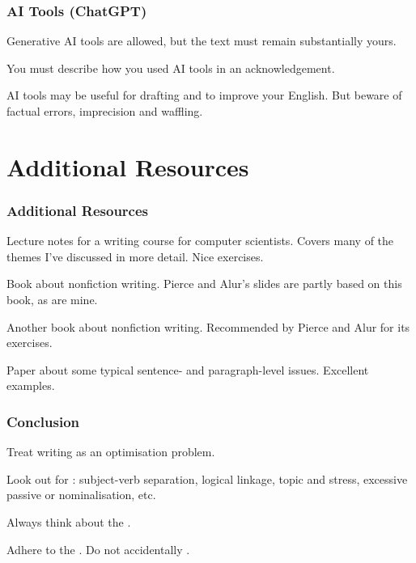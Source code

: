 \begin{frame}
  \frametitle{AI Tools (ChatGPT)}

  Generative AI tools are allowed, but the text must remain substantially yours.

  \medskip
  \pause

  You must describe how you used AI tools in an acknowledgement.

  \medskip
  \pause

  AI tools may be useful for drafting and to improve your English.
  But beware of factual errors, imprecision and waffling.
\end{frame}

\section{Additional Resources}

\begin{frame}
  \frametitle{Additional Resources}

  \small


  Lecture notes for a writing course for computer scientists.
  Covers many of the themes I've discussed in more detail.
  Nice exercises.

  \medskip


  Book about nonfiction writing.
  Pierce and Alur's slides are partly based on this book, as are mine.

  \medskip


  Another book about nonfiction writing.
  Recommended by Pierce and Alur for its exercises.

  \medskip


  Paper about some typical sentence- and paragraph-level issues.
  Excellent examples.
\end{frame}

\begin{frame}
  \frametitle{Conclusion}

   Treat writing as an optimisation problem.

  \medskip
  \pause

  Look out for : subject-verb separation, logical linkage, topic and stress, excessive passive or nominalisation, etc.

  \medskip
  \pause

  Always think about the .

  \medskip
  \pause

  Adhere to the . Do not accidentally .
\end{frame}


